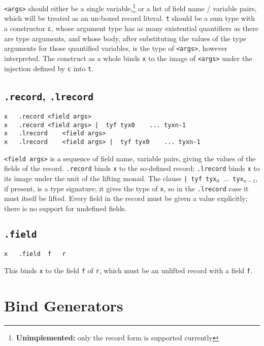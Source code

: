 \documentclass{report}
\newcommand\stringcode[1]{\texttt{#1}}
\newcommand\unimpl[1]{\footnote{\textbf{Unimplemented: }#1}}
\begin{document}
\stringcode{<args>} should either be a single variable,\unimpl{only the record form is supported currently}
or a list of field name / variable pairs, which will be treated as an un-boxed record literal.
\stringcode{t} should be a sum type with a constructor \stringcode{c},
whose argument type has as many existential quantifiers as there are type arguments,
and whose body, after substituting the values of the type arguments for those quantified variables,
is the type of \stringcode{<args>}, however interpreted.
The construct as a whole binds \stringcode{x} to the image of \stringcode{<args>} under the injection defined by \stringcode{c} into \stringcode{t}.

\subsection{\stringcode{.record}, \stringcode{.lrecord}}

\begin{verbatim}
x	.record	<field args>
x	.record	<field args> |	tyf	tyx0	...	tyxn-1
x	.lrecord	<field args>
x	.lrecord	<field args> |	tyf	tyx0	...	tyxn-1
\end{verbatim}

\stringcode{<field args>} is a sequence of field name, variable pairs, giving the values of the fields of the record.
\stringcode{.record} binds \stringcode{x} to the so-defined record;
\stringcode{.lrecord} binds \stringcode{x} to its image under the unit of the lifting monad.
The clause \stringcode{| tyf tyx$_0$ $\ldots$ tyx$_{n-1}$}, if present, is a type signature;
it gives the type of \stringcode{x}, so in the \stringcode{.lrecord} case it must itself be lifted.
Every field in the record must be given a value explicitly; there is no support for undefined fields.

\subsection{\stringcode{.field}}

\begin{verbatim}
x	.field	f	r
\end{verbatim}

This binds \stringcode{x} to the field \stringcode{f} of \stringcode{r}, which must be an unlifted record with a field \stringcode{f}.

\section{Bind Generators}
\label{bind}
\end{document}

